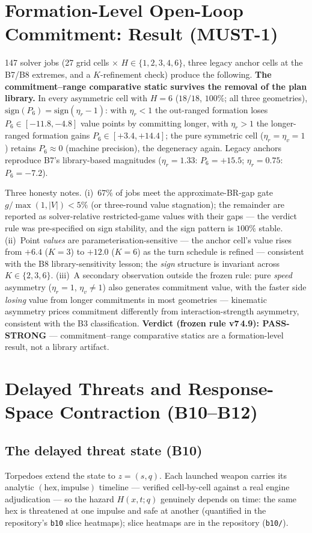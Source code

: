 \documentclass[12pt,a4paper]{article}
\newcommand{\etav}{\eta_v}
\newcommand{\etar}{\eta_r}
\begin{document}
\section{Formation-Level Open-Loop Commitment: Result (MUST-1)}\label{sec:commitment-result}

147 solver jobs (27 grid cells $\times$ $H\in\{1,2,3,4,6\}$, three legacy
anchor cells at the B7/B8 extremes, and a $K$-refinement check) produce the
following.  \textbf{The commitment--range comparative static survives the
removal of the plan library.}  In every asymmetric cell with $H=6$
($18/18$, $100\%$; all three geometries), $\mathrm{sign}(P_6)=
\mathrm{sign}(\etar-1)$: with $\etar<1$ the out-ranged formation loses
$P_6\in[-11.8,-4.8]$ value points by committing longer, with $\etar>1$
the longer-ranged formation gains $P_6\in[+3.4,+14.4]$; the pure
symmetric cell ($\etar=\etav=1$) retains $P_6\approx0$ (machine
precision), the degeneracy again.  Legacy anchors reproduce B7's
library-based magnitudes ($\etar=1.33$: $P_6=+15.5$; $\etar=0.75$:
$P_6=-7.2$).

Three honesty notes.  (i)~$67\%$ of jobs meet the approximate-BR-gap gate
$g/\max(1,|V|)<5\%$ (or three-round value stagnation); the remainder are
reported as solver-relative restricted-game values with their gaps ---
the verdict rule was pre-specified on sign stability, and the sign
pattern is $100\%$ stable.  (ii)~Point \emph{values} are
parameterisation-sensitive --- the anchor cell's value rises from
$+6.4$ ($K{=}3$) to $+12.0$ ($K{=}6$) as the turn schedule is refined ---
consistent with the B8 library-sensitivity lesson; the \emph{sign}
structure is invariant across $K\in\{2,3,6\}$.  (iii)~A secondary
observation outside the frozen rule: pure \emph{speed} asymmetry
($\etar=1$, $\etav\ne1$) also generates commitment value, with the
faster side \emph{losing} value from longer commitments in most
geometries --- kinematic asymmetry prices commitment differently from
interaction-strength asymmetry, consistent with the B3 classification.
\textbf{Verdict (frozen rule v7\,4.9): PASS-STRONG} --- commitment--range
comparative statics are a formation-level result, not a library artifact.

\section{Delayed Threats and Response-Space Contraction (B10--B12)}
\label{sec:threat}

\subsection{The delayed threat state (B10)}
Torpedoes extend the state to $z=(s,q)$.  Each launched weapon carries its
analytic $(\text{hex},\text{impulse})$ timeline --- verified cell-by-cell
against a real engine adjudication --- so the hazard
$H(x,t;q)$ genuinely depends on time: the same hex is threatened at one
impulse and safe at another (quantified in the repository's
\texttt{b10} slice heatmaps); slice heatmaps are in the repository
(\texttt{b10/}).
\end{document}
